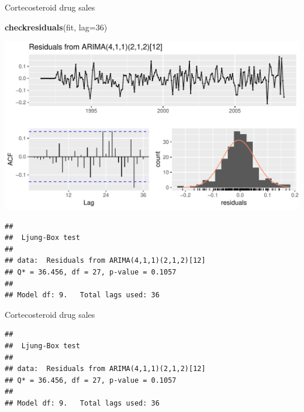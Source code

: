 \documentclass[14pt,ignorenonframetext,]{beamer}
\newenvironment{Shaded}{\begin{snugshade}}{\end{snugshade}}
\newcommand{\KeywordTok}[1]{\textcolor[rgb]{0.13,0.29,0.53}{\textbf{#1}}}
\newcommand{\DataTypeTok}[1]{\textcolor[rgb]{0.13,0.29,0.53}{#1}}
\newcommand{\DecValTok}[1]{\textcolor[rgb]{0.00,0.00,0.81}{#1}}
\newcommand{\NormalTok}[1]{#1}
\begin{document}
\begin{frame}[fragile]{Cortecosteroid drug sales}

\fontsize{10}{12}\sf

\begin{Shaded}
\begin{Highlighting}[]
\KeywordTok{checkresiduals}\NormalTok{(fit, }\DataTypeTok{lag=}\DecValTok{36}\NormalTok{)}
\end{Highlighting}
\end{Shaded}

\includegraphics{week_5_arima_files/figure-beamer/unnamed-chunk-55-1.pdf}

\begin{verbatim}
## 
##  Ljung-Box test
## 
## data:  Residuals from ARIMA(4,1,1)(2,1,2)[12]
## Q* = 36.456, df = 27, p-value = 0.1057
## 
## Model df: 9.   Total lags used: 36
\end{verbatim}

\end{frame}

\begin{frame}[fragile]{Cortecosteroid drug sales}

\fontsize{11}{15}\sf

\begin{verbatim}
## 
##  Ljung-Box test
## 
## data:  Residuals from ARIMA(4,1,1)(2,1,2)[12]
## Q* = 36.456, df = 27, p-value = 0.1057
## 
## Model df: 9.   Total lags used: 36
\end{verbatim}

\end{frame}
\end{document}
